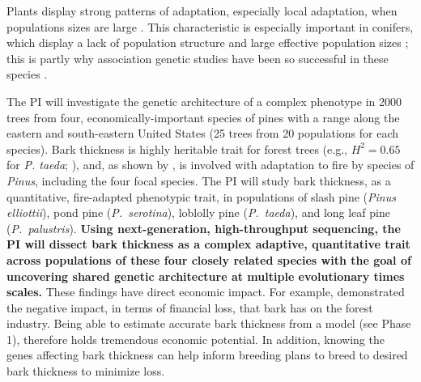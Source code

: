 Plants display strong patterns of adaptation, especially local adaptation, when populations sizes are large \citep{Leimu:2008fb}.
This characteristic is especially important in conifers, which display a lack of population structure and large effective population 
sizes \citep{Neale:2004hi}; this is partly why association genetic studies have been so successful in these species 
\citep{Eckert:2012cw,Eckert:2010hd, Wegrzyn:2010dd,Eckert:2009hh,GonzalezMartinez:2007gy,GonzalezMartinez:2006ij,Gupta:2005fx}.

The PI will investigate the genetic architecture of a complex phenotype in 2000 trees from four, economically-important 
species of pines with a range along the eastern and south-eastern United States (25 trees from 20 populations for each species).
Bark thickness is highly heritable trait for forest trees (e.g., $H^2 = 0.65$ for \emph{P. taeda}; \citet{Pederick1970}), and, as shown by 
\citet{He:2012bz}, is involved with adaptation to fire by species of \emph{Pinus}, including the four focal species.
The PI will study bark thickness, as a quantitative, fire-adapted phenotypic trait, in populations of slash 
pine (\emph{Pinus elliottii}), pond pine (\emph{P.\ serotina}), loblolly pine (\emph{P.\ taeda}), and long leaf pine 
(\emph{P.\ palustris}).  \textbf{Using next-generation, high-throughput sequencing, the PI will dissect bark thickness as a complex 
adaptive, quantitative trait across populations of these four closely related species with the goal of uncovering shared genetic 
architecture at multiple evolutionary times scales.}  These findings have direct economic impact.  For example, \citet{Marshall:2006wl} 
demonstrated the negative impact, in terms of financial loss, that bark has on the forest industry.  Being able to estimate accurate 
bark thickness from a model (see Phase 1), therefore holds tremendous economic potential.  In addition, knowing the genes affecting bark 
thickness can help inform breeding plans to breed to desired bark thickness to minimize loss.

